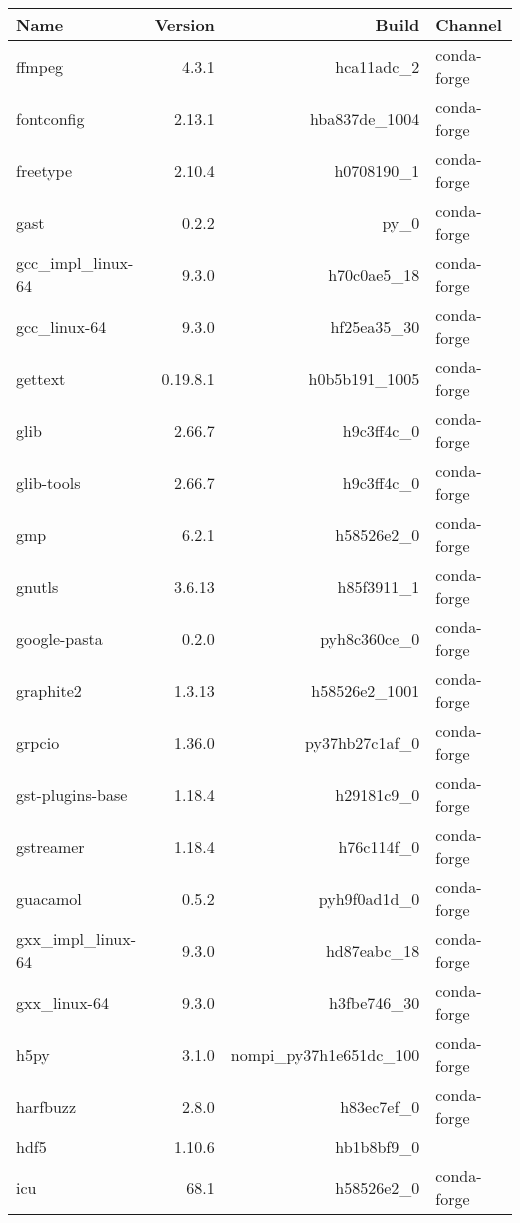 \begin{table}[h]
\begin{center}
\begin{tabular}{|l|r|r|l|}
			
		\end{tabular}
	\end{center}
\end{table}

\begin{table}
	\begin{center}
		\begin{tabular}{|l|r|r|l|}
			\textbf{Name} &\textbf{Version} &\textbf{Build} &\textbf{Channel} \\
			\hline
			ffmpeg &4.3.1 & hca11adc\_2 &conda-forge \\
			fontconfig &2.13.1 & hba837de\_1004 &conda-forge \\
			freetype &2.10.4 & h0708190\_1 &conda-forge \\
			gast &0.2.2 & py\_0 &conda-forge \\
			gcc\_impl\_linux-64 &9.3.0 & h70c0ae5\_18 &conda-forge \\
			gcc\_linux-64 &9.3.0 & hf25ea35\_30 &conda-forge \\
			gettext &0.19.8.1 & h0b5b191\_1005 &conda-forge \\
			glib &2.66.7 & h9c3ff4c\_0 &conda-forge \\
			glib-tools &2.66.7 & h9c3ff4c\_0 &conda-forge \\
			gmp &6.2.1 & h58526e2\_0 &conda-forge \\
			gnutls &3.6.13 & h85f3911\_1 &conda-forge \\
			google-pasta &0.2.0 & pyh8c360ce\_0 &conda-forge \\
			graphite2 &1.3.13 & h58526e2\_1001 &conda-forge \\
			grpcio &1.36.0 & py37hb27c1af\_0 &conda-forge \\
			gst-plugins-base &1.18.4 & h29181c9\_0 &conda-forge \\
			gstreamer &1.18.4 & h76c114f\_0 &conda-forge \\
			guacamol &0.5.2 & pyh9f0ad1d\_0 &conda-forge \\
			gxx\_impl\_linux-64 &9.3.0 & hd87eabc\_18 &conda-forge \\
			gxx\_linux-64 &9.3.0 & h3fbe746\_30 &conda-forge \\
			h5py &3.1.0 & nompi\_py37h1e651dc\_100 &conda-forge \\
			harfbuzz &2.8.0 & h83ec7ef\_0 &conda-forge \\
			hdf5 &1.10.6 & hb1b8bf9\_0 & \\
			icu &68.1 & h58526e2\_0 &conda-forge \\

\end{tabular}
\end{center}
\end{table}
